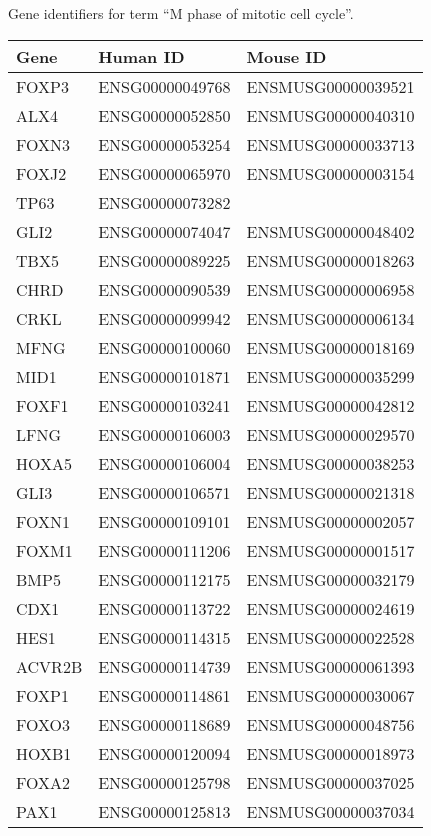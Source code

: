     {Gene identifiers for  term “M phase of mitotic cell cycle”.}{}

\begin{longtable}{lll}
    \toprule
    Gene & Human ID & Mouse ID \\
    \midrule
    FOXP3 & ENSG00000049768 & ENSMUSG00000039521 \\
    ALX4 & ENSG00000052850 & ENSMUSG00000040310 \\
    FOXN3 & ENSG00000053254 & ENSMUSG00000033713 \\
    FOXJ2 & ENSG00000065970 & ENSMUSG00000003154 \\
    TP63 & ENSG00000073282 &  \\
    GLI2 & ENSG00000074047 & ENSMUSG00000048402 \\
    TBX5 & ENSG00000089225 & ENSMUSG00000018263 \\
    CHRD & ENSG00000090539 & ENSMUSG00000006958 \\
    CRKL & ENSG00000099942 & ENSMUSG00000006134 \\
    MFNG & ENSG00000100060 & ENSMUSG00000018169 \\
    MID1 & ENSG00000101871 & ENSMUSG00000035299 \\
    FOXF1 & ENSG00000103241 & ENSMUSG00000042812 \\
    LFNG & ENSG00000106003 & ENSMUSG00000029570 \\
    HOXA5 & ENSG00000106004 & ENSMUSG00000038253 \\
    GLI3 & ENSG00000106571 & ENSMUSG00000021318 \\
    FOXN1 & ENSG00000109101 & ENSMUSG00000002057 \\
    FOXM1 & ENSG00000111206 & ENSMUSG00000001517 \\
    BMP5 & ENSG00000112175 & ENSMUSG00000032179 \\
    CDX1 & ENSG00000113722 & ENSMUSG00000024619 \\
    HES1 & ENSG00000114315 & ENSMUSG00000022528 \\
    ACVR2B & ENSG00000114739 & ENSMUSG00000061393 \\
    FOXP1 & ENSG00000114861 & ENSMUSG00000030067 \\
    FOXO3 & ENSG00000118689 & ENSMUSG00000048756 \\
    HOXB1 & ENSG00000120094 & ENSMUSG00000018973 \\
    FOXA2 & ENSG00000125798 & ENSMUSG00000037025 \\
    PAX1 & ENSG00000125813 & ENSMUSG00000037034 \\

\end{longtable}
